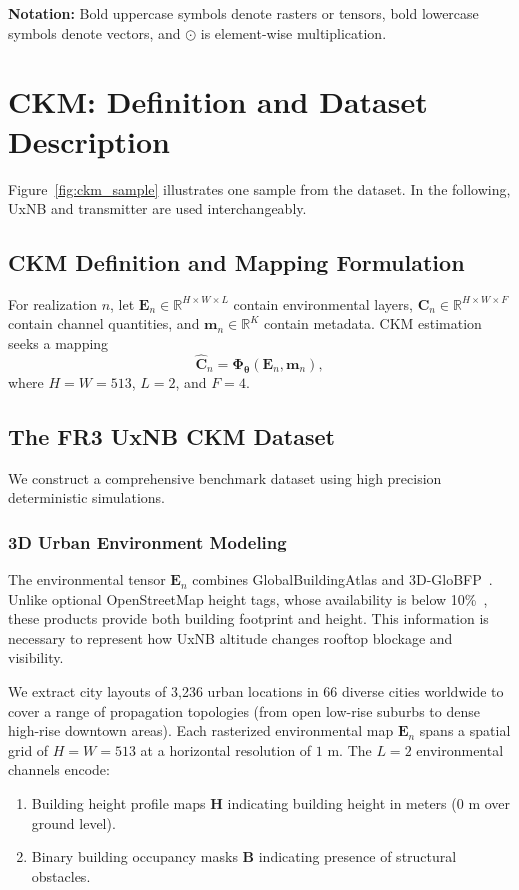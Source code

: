 \documentclass[10pt,conference,letterpaper]{IEEEtran}
\begin{document}
\textbf{Notation:} Bold uppercase symbols denote rasters or tensors, bold
lowercase symbols denote vectors, and $\odot$ is element-wise multiplication.

\section{CKM: Definition and Dataset Description}
\label{sec:ckm_dataset}

Figure~\ref{fig:ckm_sample} illustrates one sample from the dataset. In the
following, UxNB and transmitter are used interchangeably.

\subsection{CKM Definition and Mapping Formulation}
\label{sec:ckm_def}
For realization $n$, let $\mathbf E_n\in\mathbb R^{H\times W\times L}$
contain environmental layers, $\mathbf C_n\in\mathbb R^{H\times W\times F}$
contain channel quantities, and $\mathbf m_n\in\mathbb R^K$ contain metadata.
CKM estimation seeks a mapping
\begin{equation}
\widehat{\mathbf C}_n=\mathbf\Phi_{\boldsymbol\theta}
(\mathbf E_n,\mathbf m_n),
\label{eq:mapping_generic}
\end{equation}
where $H=W=513$, $L=2$, and $F=4$.

\subsection{The FR3 UxNB CKM Dataset}
\label{sec:dataset_details}
We construct a comprehensive benchmark dataset using high precision deterministic simulations.

\subsubsection{3D Urban Environment Modeling}
\label{sec:env_model}
The environmental tensor $\mathbf E_n$ combines GlobalBuildingAtlas and
3D-GloBFP~\cite{Che2024globfp,Zhu2025atlas}. Unlike optional OpenStreetMap
height tags, whose availability is below 10\%~\cite{Bernard2022}, these products
provide both building footprint and height. This information is necessary to
represent how UxNB altitude changes rooftop blockage and visibility.

We extract city layouts of 3,236 urban locations in 66 diverse cities worldwide to cover a range of propagation topologies (from open low-rise suburbs to dense high-rise downtown areas). Each rasterized environmental map $\mathbf{E}_n$ spans a spatial grid of $H = W = 513$ at a horizontal resolution of $1\text{~m}$. The $L=2$ environmental channels encode:
\begin{enumerate}
    \item Building height profile maps $\mathbf{H}$ indicating building height in meters ($0\text{~m}$ over ground level).
    \item Binary building occupancy masks $\mathbf{B}$ indicating presence of structural obstacles.
\end{enumerate}
\end{document}
